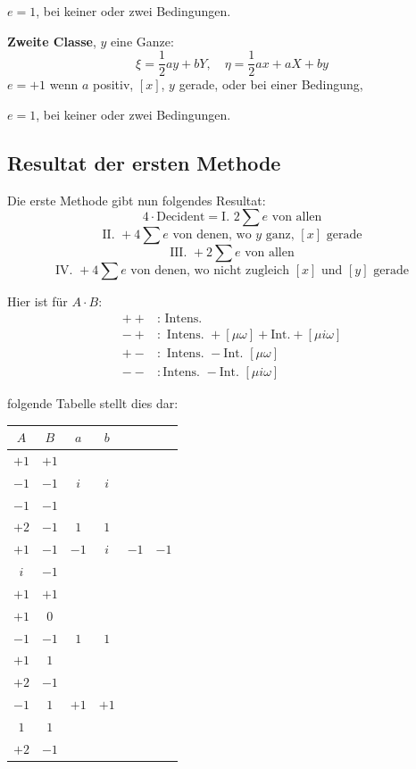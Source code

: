 \documentclass[12pt,a4paper]{article}
\begin{document}
$e = 1$, bei keiner oder zwei Bedingungen.

\textbf{Zweite Classe}, $y$ eine Ganze:
\[
\xi = \frac{1}{2}ay + bY, \quad \eta = \frac{1}{2}ax + aX + by
\]
$e = +1$ wenn $a$ positiv, $[x]$, $y$ gerade, oder bei einer Bedingung,

$e = 1$, bei keiner oder zwei Bedingungen.

\subsection*{Resultat der ersten Methode}

Die erste Methode gibt nun folgendes Resultat:
\[
4 \cdot \text{Decident} = \text{I. } 2\sum e \text{ von allen}
\]
\[
\text{II. } + 4\sum e \text{ von denen, wo } y \text{ ganz, } [x] \text{ gerade}
\]
\[
\text{III. } + 2\sum e \text{ von allen}
\]
\[
\text{IV. } + 4\sum e \text{ von denen, wo nicht zugleich } [x] \text{ und } [y] \text{ gerade}
\]

Hier ist für $A \cdot B$:
\begin{align*}
+ + &: \text{ Intens.}\\
- + &: \text{ Intens. } +[\mu\omega] + \text{Int.} + [\mu i\omega]\\
+ - &: \text{ Intens. } - \text{Int. } [\mu\omega]\\
- - &: \text{Intens. } - \text{Int. } [\mu i\omega]
\end{align*}

folgende Tabelle stellt dies dar:

\begin{center}
\begin{tabular}{c|cccc}
$A$ & $B$ & $a$ & $b$ & \\
\hline
$+1$ & $+1$ & & & \\
$-1$ & $-1$ & $i$ & $i$ & \\
$-1$ & $-1$ & & & \\
$+2$ & $-1$ & $1$ & $1$ & \\
$+1$ & $-1$ & $-1$ & $i$ & $-1$ & $-1$ \\
$i$ & $-1$ & & & \\
$+1$ & $+1$ & & & \\
$+1$ & $0$ & & & \\
$-1$ & $-1$ & $1$ & $1$ & \\
$+1$ & $1$ & & & \\
$+2$ & $-1$ & & & \\
$-1$ & $1$ & $+1$ & $+1$ & \\
$1$ & $1$ & & & \\
$+2$ & $-1$ & & & \\
\end{tabular}
\end{center}
\end{document}
